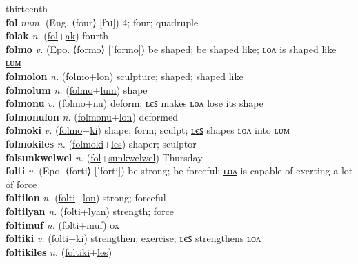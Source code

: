 thirteenth \label{fakak} \\
\textbf{fol} \textit{num.} (Eng. ⟨four⟩ [fɔɹ])
4; four; quadruple \label{fol} \\
\textbf{folak} \textit{n.} (\hyperref[fol]{fol}+\hyperref[ak]{ak})
fourth \label{folak} \\
\textbf{folmo} \textit{v.} (Epo. ⟨formo⟩ [ˈformo])
be shaped; be shaped like; \hyperref[folmolon]{ʟᴏᴧ} is shaped like \hyperref[folmolum]{ʟᴜᴍ} \label{folmo} \\
\textbf{folmolon} \textit{n.} (\hyperref[folmo]{folmo}+\hyperref[lon]{lon})
sculpture; shaped; shaped like \label{folmolon} \\
\textbf{folmolum} \textit{n.} (\hyperref[folmo]{folmo}+\hyperref[lum]{lum})
shape \label{folmolum} \\
\textbf{folmonu} \textit{v.} (\hyperref[folmo]{folmo}+\hyperref[nu]{nu})
deform; ʟєꜱ makes \hyperref[folmonulon]{ʟᴏᴧ} lose its shape \label{folmonu} \\
\textbf{folmonulon} \textit{n.} (\hyperref[folmonu]{folmonu}+\hyperref[lon]{lon})
deformed \label{folmonulon} \\
\textbf{folmoki} \textit{v.} (\hyperref[folmo]{folmo}+\hyperref[ki]{ki})
shape; form; sculpt; \hyperref[folmokiles]{ʟєꜱ} shapes ʟᴏᴧ into ʟᴜᴍ \label{folmoki} \\
\textbf{folmokiles} \textit{n.} (\hyperref[folmoki]{folmoki}+\hyperref[les]{les})
shaper; sculptor \label{folmokiles} \\
\textbf{folsunkwelwel} \textit{n.} (\hyperref[fol]{fol}+\hyperref[sunkwelwel]{sunkwelwel})
Thursday \label{folsunkwelwel} \\
\textbf{folti} \textit{v.} (Epo. ⟨forti⟩ [ˈforti])
be strong; be forceful; \hyperref[foltilon]{ʟᴏᴧ} is capable of exerting a lot of force \label{folti} \\
\textbf{foltilon} \textit{n.} (\hyperref[folti]{folti}+\hyperref[lon]{lon})
strong; forceful \label{foltilon} \\
\textbf{foltilyan} \textit{n.} (\hyperref[folti]{folti}+\hyperref[lyan]{lyan})
strength; force \label{foltilyan} \\
\textbf{foltimuf} \textit{n.} (\hyperref[folti]{folti}+\hyperref[muf]{muf})
ox \label{foltimuf} \\
\textbf{foltiki} \textit{v.} (\hyperref[folti]{folti}+\hyperref[ki]{ki})
strengthen; exercise; \hyperref[foltikiles]{ʟєꜱ} strengthens ʟᴏᴧ \label{foltiki} \\
\textbf{foltikiles} \textit{n.} (\hyperref[foltiki]{foltiki}+\hyperref[les]{les})
